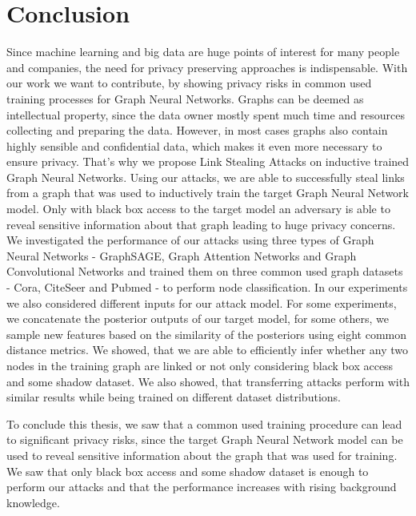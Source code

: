 \chapter{Conclusion}
    Since machine learning and big data are huge points of interest for many people and companies, the need for privacy preserving approaches is indispensable.
    With our work we want to contribute, by showing privacy risks in common used training processes for Graph Neural Networks.
    Graphs can be deemed as intellectual property, since the data owner mostly spent much time and resources collecting and preparing the data.
    However, in most cases graphs also contain highly sensible and confidential data, which makes it even more necessary to ensure privacy.
    That's why we propose Link Stealing Attacks on inductive trained Graph Neural Networks.
    Using our attacks, we are able to successfully steal links from a graph that was used to inductively train the target Graph Neural Network model.
    Only with black box access to the target model an adversary is able to reveal sensitive information about that graph leading to huge privacy concerns.
    We investigated the performance of our attacks using three types of Graph Neural Networks - GraphSAGE, Graph Attention Networks and Graph Convolutional Networks and trained them on three common used graph datasets - Cora, CiteSeer and Pubmed - to perform node classification.
    In our experiments we also considered different inputs for our attack model.
    For some experiments, we concatenate the posterior outputs of our target model, for some others, we sample new features based on the similarity of the posteriors using eight common distance metrics.   
    We showed, that we are able to efficiently infer whether any two nodes in the training graph are linked or not only considering black box access and some shadow dataset.
    We also showed, that transferring attacks perform with similar results while being trained on different dataset distributions.

    To conclude this thesis, we saw that a common used training procedure can lead to significant privacy risks, since the target Graph Neural Network model can be used to reveal sensitive information about the graph that was used for training.
    We saw that only black box access and some shadow dataset is enough to perform our attacks and that the performance increases with rising background knowledge.
